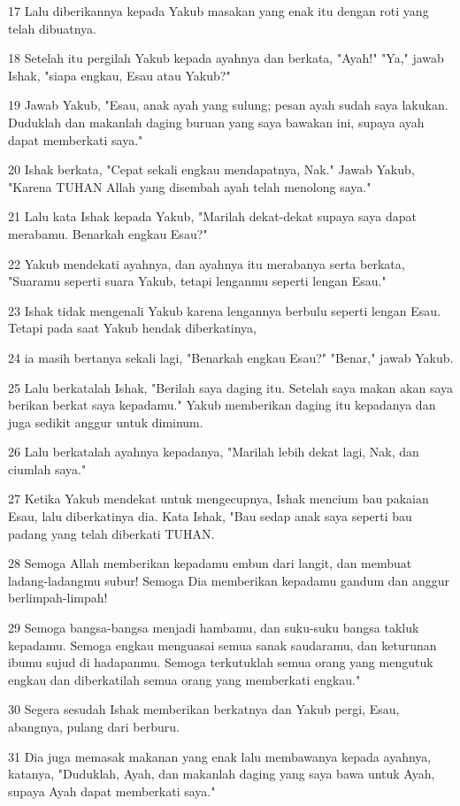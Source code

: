 \par 17 Lalu diberikannya kepada Yakub masakan yang enak itu dengan roti yang telah dibuatnya.
\par 18 Setelah itu pergilah Yakub kepada ayahnya dan berkata, "Ayah!" "Ya," jawab Ishak, "siapa engkau, Esau atau Yakub?"
\par 19 Jawab Yakub, "Esau, anak ayah yang sulung; pesan ayah sudah saya lakukan. Duduklah dan makanlah daging buruan yang saya bawakan ini, supaya ayah dapat memberkati saya."
\par 20 Ishak berkata, "Cepat sekali engkau mendapatnya, Nak." Jawab Yakub, "Karena TUHAN Allah yang disembah ayah telah menolong saya."
\par 21 Lalu kata Ishak kepada Yakub, "Marilah dekat-dekat supaya saya dapat merabamu. Benarkah engkau Esau?"
\par 22 Yakub mendekati ayahnya, dan ayahnya itu merabanya serta berkata, "Suaramu seperti suara Yakub, tetapi lenganmu seperti lengan Esau."
\par 23 Ishak tidak mengenali Yakub karena lengannya berbulu seperti lengan Esau. Tetapi pada saat Yakub hendak diberkatinya,
\par 24 ia masih bertanya sekali lagi, "Benarkah engkau Esau?" "Benar," jawab Yakub.
\par 25 Lalu berkatalah Ishak, "Berilah saya daging itu. Setelah saya makan akan saya berikan berkat saya kepadamu." Yakub memberikan daging itu kepadanya dan juga sedikit anggur untuk diminum.
\par 26 Lalu berkatalah ayahnya kepadanya, "Marilah lebih dekat lagi, Nak, dan ciumlah saya."
\par 27 Ketika Yakub mendekat untuk mengecupnya, Ishak mencium bau pakaian Esau, lalu diberkatinya dia. Kata Ishak, "Bau sedap anak saya seperti bau padang yang telah diberkati TUHAN.
\par 28 Semoga Allah memberikan kepadamu embun dari langit, dan membuat ladang-ladangmu subur! Semoga Dia memberikan kepadamu gandum dan anggur berlimpah-limpah!
\par 29 Semoga bangsa-bangsa menjadi hambamu, dan suku-suku bangsa takluk kepadamu. Semoga engkau menguasai semua sanak saudaramu, dan keturunan ibumu sujud di hadapanmu. Semoga terkutuklah semua orang yang mengutuk engkau dan diberkatilah semua orang yang memberkati engkau."
\par 30 Segera sesudah Ishak memberikan berkatnya dan Yakub pergi, Esau, abangnya, pulang dari berburu.
\par 31 Dia juga memasak makanan yang enak lalu membawanya kepada ayahnya, katanya, "Duduklah, Ayah, dan makanlah daging yang saya bawa untuk Ayah, supaya Ayah dapat memberkati saya."
